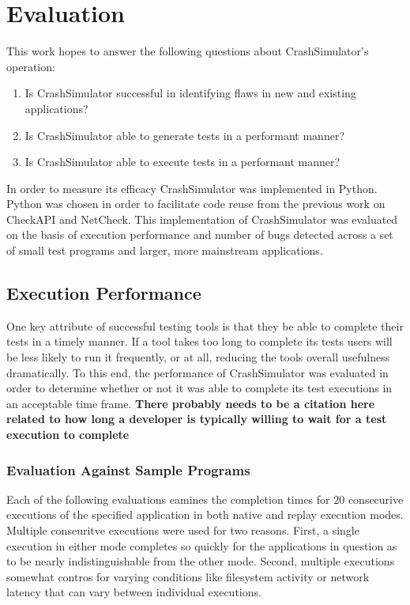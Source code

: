 \section{Evaluation}

    This work hopes to answer the following questions about CrashSimulator's operation:

        \begin{enumerate}
            \item{Is CrashSimulator successful in identifying flaws in new and existing applications?}
            \item{Is CrashSimulator able to generate tests in a performant manner?}
            \item{Is CrashSimulator able to execute tests in a performant manner?}
        \end{enumerate}

    In order to measure its efficacy CrashSimulator was implemented in Python. Python was chosen in order to facilitate
    code reuse from the previous work on CheckAPI and NetCheck. This implementation of CrashSimulator was evaluated on
    the basis of execution performance and number of bugs detected across a set of small test programs and larger, more
    mainstream applications.

    \subsection{Execution Performance}

        One key attribute of successful testing tools is that they be able to complete their tests in a timely manner.
        If a tool takes too long to complete its tests users will be less likely to run it frequently, or at all,
        reducing the tools overall usefulness dramatically. To this end, the performance of CrashSimulator was evaluated
        in order to determine whether or not it was able to complete its test executions in an acceptable time frame.
        \textbf{There probably needs to be a citation here related to how long a developer is typically willing to wait
        for a test execution to complete}

        \subsubsection{Evaluation Against Sample Programs}

        Each of the following evaluations eamines the completion times for 20 consecurive executions of the specified
        application in both native and replay execution modes.  Multiple conseuritve executions were used for two
        reasons.  First, a single execution in either mode completes so quickly for the applications in question as to
        be nearly indistinguishable from the other mode.  Second, multiple executions somewhat contros for varying
        conditions like filesystem activity or network latency that can vary between individual executions.

